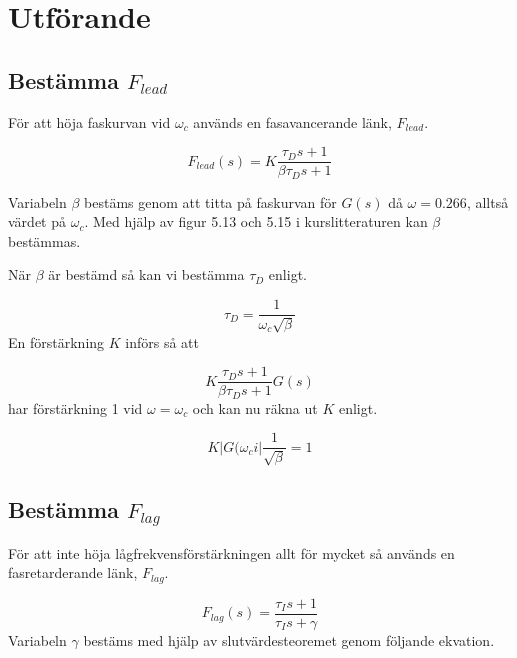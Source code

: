 \documentclass[a4paper]{article}
\begin{document}

\section{Utförande}



\subsection{Bestämma $F_{lead}$}

För att höja faskurvan vid $\omega_{c}$ används en fasavancerande länk, $F_{lead}$.

\begin{equation}
  F_{lead}(s)=K\frac{\tau_{D}s+1}{\beta\tau_{D}s+1}
\end{equation}

Variabeln $\beta$ bestäms genom att titta på faskurvan för $G(s)$ då $\omega = 0.266$, alltså värdet på $\omega_c$. 
Med hjälp av figur 5.13 och 5.15 i kurslitteraturen \cite{kb} kan $\beta$ bestämmas.

När $\beta$ är bestämd så kan vi bestämma $\tau_D$ enligt.

\begin{equation}
  \tau_D=\frac{1}{\omega_c\sqrt{\beta}}
\end{equation}
En förstärkning $K$ införs så att 

\begin{equation}
  K\frac{\tau_Ds+1}{\beta\tau_Ds+1}G(s)
\end{equation}
har förstärkning 1 vid $\omega = \omega_c$ och kan nu räkna ut $K$ enligt.

\begin{equation}
  K|G(\omega_ci|\frac{1}{\sqrt{\beta}}=1
\end{equation}

\subsection{Bestämma $F_{lag}$}

För att inte höja lågfrekvensförstärkningen allt för mycket så används en fasretarderande länk, $F_{lag}$.

\begin{equation}
  F_{lag}(s)=\frac{\tau_Is+1}{\tau_Is+\gamma}
\end{equation}
Variabeln $\gamma$ bestäms med hjälp av slutvärdesteoremet genom följande ekvation.
\end{document}
